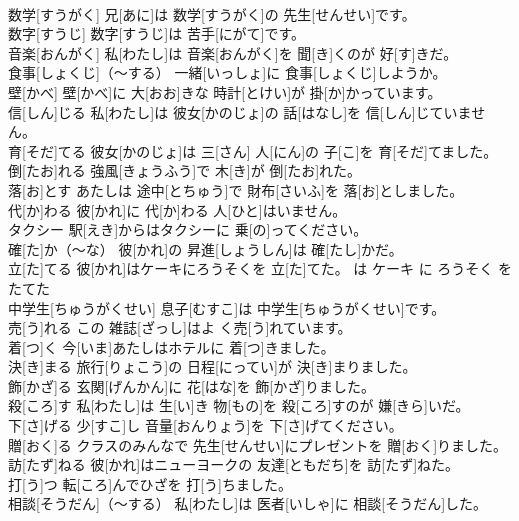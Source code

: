 \documentclass[8pt]{extreport}
\begin{document}
\begin{CJK}{UTF8}{min}
\\	数学[すうがく]	兄[あに]は 数学[すうがく]の 先生[せんせい]です。		
\\	数字[すうじ]	数字[すうじ]は 苦手[にがて]です。		
\\	音楽[おんがく]	私[わたし]は 音楽[おんがく]を 聞[き]くのが 好[す]きだ。		
\\	食事[しょくじ]（～する）	一緒[いっしょ]に 食事[しょくじ]しようか。		
\\	壁[かべ]	壁[かべ]に 大[おお]きな 時計[とけい]が 掛[か]かっています。		
\\	信[しん]じる	私[わたし]は 彼女[かのじょ]の 話[はなし]を 信[しん]じていません。		
\\	育[そだ]てる	彼女[かのじょ]は 三[さん] 人[にん]の 子[こ]を 育[そだ]てました。		
\\	倒[たお]れる	強風[きょうふう]で 木[き]が 倒[たお]れた。		
\\	落[お]とす	あたしは 途中[とちゅう]で 財布[さいふ]を 落[お]としました。		
\\	代[か]わる	彼[かれ]に 代[か]わる 人[ひと]はいません。		
\\	タクシー	駅[えき]からはタクシーに 乗[の]ってください。		
\\	確[た]か（～な）	彼[かれ]の 昇進[しょうしん]は 確[たし]かだ。		
\\	立[た]てる	彼[かれ]はケーキにろうそくを 立[た]てた。 は ケーキ に ろうそく を たてた		
\\	中学生[ちゅうがくせい]	息子[むすこ]は 中学生[ちゅうがくせい]です。		
\\	売[う]れる	この 雑誌[ざっし]はよ く売[う]れています。		
\\	着[つ]く	今[いま]あたしはホテルに 着[つ]きました。		
\\	決[き]まる	旅行[りょこう]の 日程[にってい]が 決[き]まりました。		
\\	飾[かざ]る	玄関[げんかん]に 花[はな]を 飾[かざ]りました。		
\\	殺[ころ]す	私[わたし]は 生[い]き 物[もの]を 殺[ころ]すのが 嫌[きら]いだ。		
\\	下[さ]げる	少[すこ]し 音量[おんりょう]を 下[さ]げてください。		
\\	贈[おく]る	クラスのみんなで 先生[せんせい]にプレゼントを 贈[おく]りました。		
\\	訪[たず]ねる	彼[かれ]はニューヨークの 友達[ともだち]を 訪[たず]ねた。		
\\	打[う]つ	転[ころ]んでひざを 打[う]ちました。		
\\	相談[そうだん]（～する）	私[わたし]は 医者[いしゃ]に 相談[そうだん]した。		

\end{CJK}
\end{document}
